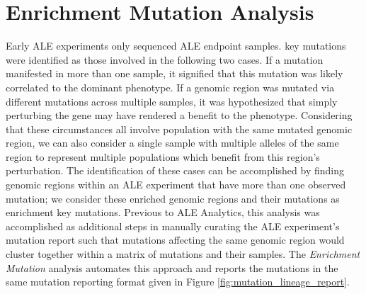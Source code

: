 \documentclass[12pt,final,masters,chapterheads]{ucsd}  %
\begin{document}
%
%

\section{Enrichment Mutation Analysis}

%
%

%
%

%
%

Early ALE experiments only sequenced ALE endpoint samples. key mutations were identified as those involved in the following two cases. If a mutation manifested in more than one sample, it signified that this mutation was likely correlated to the dominant phenotype. If a genomic region was mutated via different mutations across multiple samples, it was hypothesized that simply perturbing the gene may have rendered a benefit to the phenotype. Considering that these circumstances all involve population with the same mutated genomic region, we can also consider a single sample with multiple alleles of the same region to represent multiple populations which benefit from this region's perturbation. The identification of these cases can be accomplished by finding genomic regions within an ALE experiment that have more than one observed mutation; we consider these enriched genomic regions and their mutations as enrichment key mutations. Previous to ALE Analytics, this analysis was accomplished as additional steps in manually curating the ALE experiment's mutation report such that mutations affecting the same genomic region would cluster together within a matrix of mutations and their samples. The \textit{Enrichment Mutation} analysis automates this approach and reports the mutations in the same mutation reporting format given in Figure \ref{fig:mutation_lineage_report}.
\end{document}
